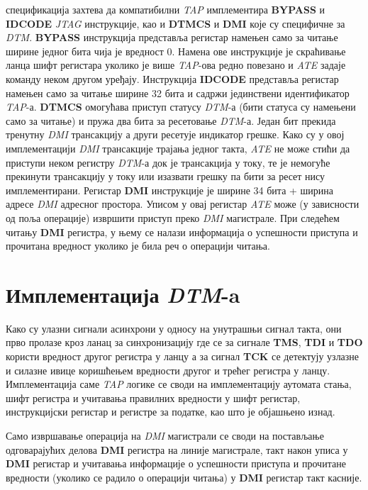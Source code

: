  спецификација \cite{debug_spec} захтева да компатибилни \textit{\acrshort{TAP}} имплементира \textbf{BYPASS} и \textbf{IDCODE} \textit{\acrshort{JTAG}} инструкције, као и \textbf{\acrshort{DTMCS}} и \textbf{\acrshort{DMI}} које су специфичне за  \textit{\acrshort{DTM}}. \textbf{BYPASS} инструкција представља регистар намењен само за читање ширине једног бита чија је вредност 0. Намена ове инструкције је скраћивање ланца шифт регистара уколико је више \textit{\acrshort{TAP}}-ова редно повезано и \textit{\acrshort{ATE}} задаје команду неком другом уређају. Инструкција \textbf{IDCODE} представља регистар намењен само за читање ширине 32 бита и садржи јединствени идентификатор \textit{\acrshort{TAP}}-а. \textbf{DTMCS} омогућава приступ статусу \textit{\acrshort{DTM}}-а (бити статуса су намењени само за читање) и пружа два бита за ресетовање \textit{\acrshort{DTM}}-а. Један бит прекида тренутну \textit{\acrshort{DMI}} трансакцију а други ресетује индикатор грешке. Како су у овој имплементацији \textit{\acrshort{DMI}} трансакције трајања једног такта, \textit{\acrshort{ATE}} не може стићи да приступи неком регистру \textit{\acrshort{DTM}}-а док је трансакција у току, те је немогуће прекинути трансакцију у току или изазвати грешку па бити за ресет нису имплементирани. Регистар \textbf{\acrshort{DMI}} инструкције је ширине 34 бита + ширина адресе \textit{\acrshort{DMI}} адресног простора. Уписом у овај регистар \textit{\acrshort{ATE}} може (у зависности од поља операције) извршити приступ преко \textit{\acrshort{DMI}} магистрале. При следећем читању \textbf{\acrshort{DMI}} регистра, у њему се налази информација о успешности приступа и прочитана вредност уколико је била реч о операцији читања.

\section{Имплементација \textit{\acrshort{DTM}}-a}

Како су улазни сигнали асинхрони у односу на унутрашњи сигнал такта, они прво пролазе кроз ланац за синхронизацију где се за сигнале \textbf{\acrfull{TMS}}, \textbf{\acrfull{TDI}} и \textbf{\acrfull{TDO}} користи вредност другог регистра у ланцу а за сигнал \textbf{\acrfull{TCK}} се детектују узлазне и силазне ивице коришћењем вредности другог и трећег регистра у ланцу. Имплементација саме \textit{\acrshort{TAP}} логике се своди на имплементацију аутомата стања, шифт регистра и учитавања правилних вредности у шифт регистар, инструкцијски регистар и регистре за податке, као што је објашњено изнад.

Само извршавање операција на \textit{\acrshort{DMI}} магистрали се своди на постављање одговарајућих делова \textbf{\acrshort{DMI}} регистра на линије магистрале, такт након уписа у \textbf{\acrshort{DMI}} регистар и учитавања информације о успешности приступа и прочитане вредности (уколико се радило о операцији читања) у \textbf{\acrshort{DMI}} регистар такт касније.